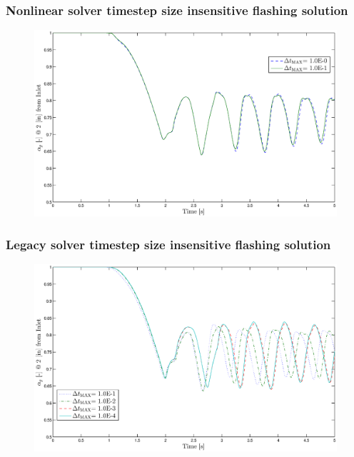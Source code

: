 \documentclass[compress,xcolor=table]{beamer}
\begin{document}
\begin{frame}
\frametitle{Nonlinear solver timestep size insensitive flashing solution}

\begin{figure}[h!t]
\centering
\includegraphics[width=.94\textwidth]{images/nl_flashing_1em0_1em1.eps}
\end{figure}

\end{frame}
\begin{frame}
\frametitle{Legacy solver timestep size insensitive flashing solution}

\begin{figure}[h!t]
\centering
\includegraphics[width=.94\textwidth]{images/cobra_flashing_1em1_1em4.eps}
\end{figure}

\end{frame}
\end{document}
